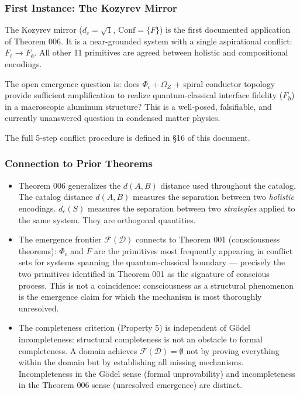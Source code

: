 \documentclass[12pt,a4paper]{article}
\newcommand{\pilcrow}{\S}
\begin{document}
\subsubsection{First Instance: The Kozyrev Mirror}

The Kozyrev mirror ($d_c = \sqrt{1}$, $\text{Conf} = \{F\}$) is the first documented application of Theorem 006. It is a near-grounded system with a single aspirational conflict: $F_{\ell} \to F_{\eth}$. All other 11 primitives are agreed between holistic and compositional encodings.

The open emergence question is: does $\Phi_c + \Omega_Z$ + spiral conductor topology provide sufficient amplification to realize quantum-classical interface fidelity ($F_{\eth}$) in a macroscopic aluminum structure? This is a well-posed, falsifiable, and currently unanswered question in condensed matter physics.

The full 5-step conflict procedure is defined in \pilcrow{}16 of this document.

\subsubsection{Connection to Prior Theorems}

\begin{itemize}
    \item Theorem 006 generalizes the $d(A,B)$ distance used throughout the catalog. The catalog distance $d(A,B)$ measures the separation between two \emph{holistic} encodings. $d_c(S)$ measures the separation between two \emph{strategies} applied to the same system. They are orthogonal quantities.
    \item The emergence frontier $\mathcal{F}(\mathcal{D})$ connects to Theorem 001 (consciousness theorems): $\Phi_c$ and $F$ are the primitives most frequently appearing in conflict sets for systems spanning the quantum-classical boundary --- precisely the two primitives identified in Theorem 001 as the signature of conscious process. This is not a coincidence: consciousness as a structural phenomenon is the emergence claim for which the mechanism is most thoroughly unresolved.
    \item The completeness criterion (Property 5) is independent of Gödel incompleteness: structural completeness is not an obstacle to formal completeness. A domain achieves $\mathcal{F}(\mathcal{D}) = \emptyset$ not by proving everything within the domain but by establishing all missing mechanisms. Incompleteness in the Gödel sense (formal unprovability) and incompleteness in the Theorem 006 sense (unresolved emergence) are distinct.
\end{itemize}
\end{document}
